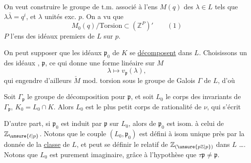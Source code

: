 
On veut construire le groupe de t.m.  associé à l'ens $M(q)$ des $\lambda\in L$ tels que $\lambda\bar\lambda=q^i$, et $\lambda$ unités exc. $p$. On a vu que
\[
M_0(q)/\text{Torsion}\subset (\mathbb Z^P)' \qquad (1)
\]
$P$ l'ens des idéaux premiers de $L$ sur $p$.

On peut supposer que les idéaux $\mathfrak p_0$ de $K$ se \uline{décomposent} dans $L$. Choisissons un des  idéaux , $\mathfrak p$, ce qui donne une forme linéaire  sur $M$
\[
\lambda\longmapsto v_{\mathfrak p}(\lambda),
\]
qui engendre d'ailleurs $\check M$ mod. torsion sous le groupe de Galois $\Gamma$ de $L$, d'où

Soit $\Gamma_{\mathfrak p}$ le groupe de décomposition pour $\mathfrak p$,   et soit  $L_0$ le corps des invariants de $\Gamma_{\mathfrak p}$, $K_0=L_0\cap K$. Alors $L_0$ est le plus petit corps de rationalité de $\nu$, qui s'écrit 

D'autre part, si $\mathfrak p_0$ est induit par $\mathfrak p$ sur $L_0$, alors   de $\mathfrak p_0$ est  isom. à celui de $\mathbb Z_{\unsure{\ell|p}}$. Notons que le couple $(L_0,\mathfrak p_0)$ est défini à isom unique près par la donnée de la \uline{classe} de $L$, et peut se définir   le  relatif de $\mathbb Z_{(\unsure{p\mathbb Z|p})}$ dans $L$ \dots. Notons que $L_0$ est purement imaginaire, grâce à l'hypothèse que $\tau\mathfrak p\ne\mathfrak p$.

